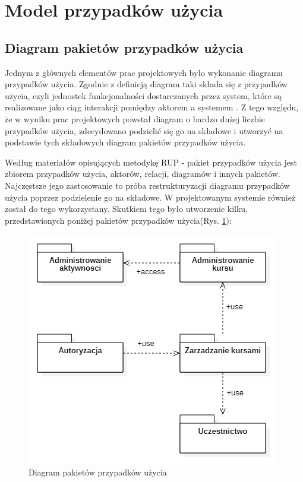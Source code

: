 \section{Model przypadków użycia}

\subsection{Diagram pakietów przypadków użycia}

Jednym z głównych elementów prac projektowych było wykonanie diagramu przypadków użycia. Zgodnie z definicją diagram taki składa się z przypadków użycia, czyli jednostek funkcjonalności dostarczanych przez system, które są realizowane jako ciąg interakcji pomiędzy aktorem a systemem \cite{usecase}. Z tego względu, że w wyniku prac projektowych powstał diagram o bardzo dużej liczbie przypadków użycia, zdecydowano podzielić się go na składowe i utworzyć na podstawie tych składowych diagram pakietów przypadków użycia. 

Według materiałów opisujących metodykę RUP \cite{caseuse} - pakiet przypadków użycia jest zbiorem przypadków użycia, aktorów, relacji, diagramów i innych pakietów. Najczęstsze jego zastosowanie to próba restrukturyzacji diagramu przypadków użycia poprzez podzielenie go na składowe. W projektowanym systemie również został do tego wykorzystany. Skutkiem tego było utworzenie kilku, przedstawionych poniżej pakietów przypadków użycia(Rys. \ref{chapter4_package}):


\begin{figure}[ht]
	\centering
	\includegraphics[scale=0.9]{img/chapter4/package_diagram.png}
	\caption{Diagram pakietów przypadków użycia}
	\label{chapter4_package}
\end{figure}

